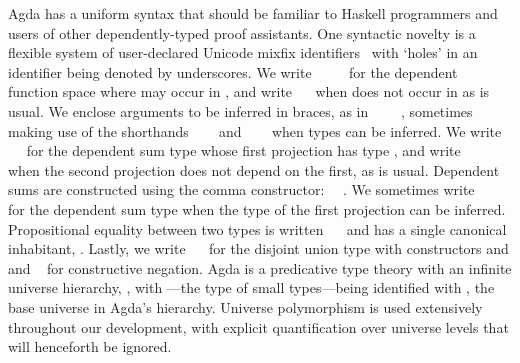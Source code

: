Agda has a uniform syntax that should be familiar to Haskell programmers and users of other dependently-typed proof assistants.
One syntactic novelty is a flexible system of user-declared Unicode mixfix identifiers~\cite{danielsson_parsing_2011} with `holes' in an identifier being denoted by underscores.
We write \AgdaSymbol{(}~\AgdaSymbol{:}~\AgdaSymbol{)}~~ for the dependent function space where  may occur in , and write ~~ when  does not occur in  as is usual.
We enclose arguments to be inferred in braces, as in \AgdaSymbol{\{}~\AgdaSymbol{:}~\AgdaSymbol{\}}~~, sometimes making use of the shorthands ~~~ and ~\AgdaSymbol{\{}\AgdaSymbol{\}}~~ when types can be inferred.
We write ~~ for the dependent sum type whose first projection has type , and write ~~ when the second projection does not depend on the first, as is usual.
Dependent sums are constructed using the comma constructor: ~\AgdaInductiveConstructor{,}~.
We sometimes write ~~~~ for the dependent sum type when the type of the first projection can be inferred.
Propositional equality between two types is written ~~ and has a single canonical inhabitant, .
Lastly, we write ~~ for the disjoint union type with constructors  and  and ~ for constructive negation.
Agda is a predicative type theory with an infinite universe hierarchy, , with ---the type of small types---being identified with , the base universe in Agda's hierarchy.
Universe polymorphism is used extensively throughout our development, with explicit quantification over universe levels that will henceforth be ignored.


